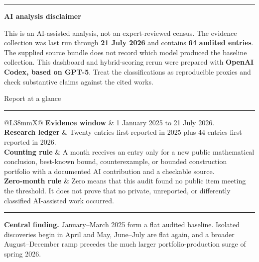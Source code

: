 \documentclass[11pt,a4paper]{article}
\newcommand{\factrow}[2]{%
  {\fontsize{9.5}{13}\selectfont\color{Charcoal}\bfseries #1} &
  {\fontsize{9.5}{13}\selectfont\color{Text}#2}\\[2.4mm]
}
\begin{document}
\begin{titlepage}
\begin{minipage}{166mm}
  \vspace{11mm}
  \colorbox{Soft}{\parbox{\linewidth}{%
    \hspace{0pt}\begin{minipage}{3pt}\color{Muted}\rule{3pt}{31mm}\end{minipage}%
    \hspace{5mm}\begin{minipage}{151mm}
      {\fontsize{9.2}{13.4}\selectfont\color{Text}
      \textbf{\color{Ink}AI analysis disclaimer}\par\vspace{1.7mm}
      This is an AI-assisted analysis, not an expert-reviewed census. The evidence collection was last run through \textbf{21 July 2026} and contains \textbf{64 audited entries}. The supplied source bundle does not record which model produced the baseline collection. This dashboard and hybrid-scoring rerun were prepared with \textbf{OpenAI Codex, based on GPT-5}. Treat the classifications as reproducible proxies and check substantive claims against the cited works.}
    \end{minipage}\hspace{0pt}}}

  \vspace{10mm}
  {\fontsize{17}{22}\selectfont\color{Charcoal}Report at a glance}\par
  \vspace{3mm}
  {\color{Rule}\rule{\linewidth}{0.6pt}}\par
  \vspace{5mm}

  \begin{tabularx}{\linewidth}{@{}L{38mm}X@{}}
    \factrow{Evidence window}{1 January 2025 to 21 July 2026.}
    \factrow{Research ledger}{Twenty entries first reported in 2025 plus 44 entries first reported in 2026.}
    \factrow{Counting rule}{A month receives an entry only for a new public mathematical conclusion, best-known bound, counterexample, or bounded construction portfolio with a documented AI contribution and a checkable source.}
    \factrow{Zero-month rule}{Zero means that this audit found no public item meeting the threshold. It does not prove that no private, unreported, or differently classified AI-assisted work occurred.}
  \end{tabularx}

  \vspace{5mm}
  \colorbox{Soft}{\parbox{\linewidth}{%
    \hspace{0pt}\begin{minipage}{3pt}\color{Blue}\rule{3pt}{20mm}\end{minipage}%
    \hspace{5mm}\begin{minipage}{151mm}
      {\fontsize{9.5}{13.5}\selectfont\color{Text}
      \textbf{\color{Ink}Central finding.} January--March 2025 form a flat audited baseline. Isolated discoveries begin in April and May, June--July are flat again, and a broader August--December ramp precedes the much larger portfolio-production surge of spring 2026.}
    \end{minipage}\hspace{0pt}}}


\end{minipage}
\end{titlepage}
\end{document}

